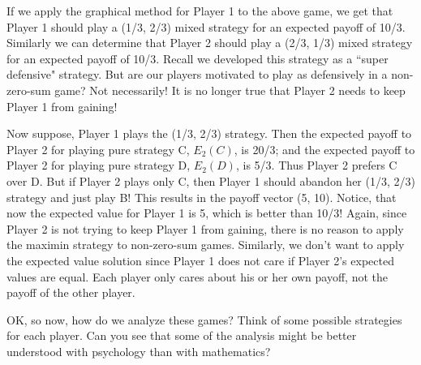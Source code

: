 If we apply the graphical method for Player 1 to the above game, we get that Player 1 should play a (1/3, 2/3) mixed strategy for an expected payoff of 10/3. Similarly we can determine that Player 2 should play a (2/3, 1/3) mixed strategy for an expected payoff of 10/3. Recall we developed this strategy as a ``super defensive" strategy. But are our players motivated to play as defensively in a non-zero-sum game? Not necessarily! It is no longer true that Player 2 needs to keep Player 1 from gaining! 

Now suppose, Player 1 plays the (1/3, 2/3) strategy. Then the expected payoff to Player 2 for playing pure strategy C, $E_2(C)$, is 20/3; and the expected payoff to Player 2 for playing pure strategy D, $E_2(D)$, is 5/3. Thus Player 2 prefers C over D. But if Player 2 plays only C, then Player 1 should abandon her (1/3, 2/3) strategy and just play B! This results in the payoff vector (5, 10). Notice, that now the expected value for Player 1 is 5, which is better than 10/3! Again, since Player 2 is not trying to keep Player 1 from gaining, there is no reason to apply the maximin strategy to non-zero-sum games. Similarly, we don't want to apply the expected value solution since Player 1 does not care if Player 2's expected values are equal. Each player only cares about his or her own payoff, not the payoff of the other player.

OK, so now, how do we analyze these games? Think of some possible strategies for each player. Can you see that some of the analysis might be better understood with psychology than with mathematics?



